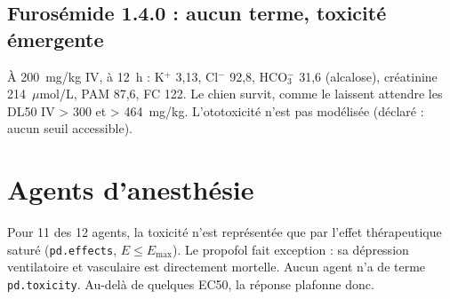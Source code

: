 \documentclass[10pt,a4paper]{article}
\newcommand{\cmd}[1]{\texttt{#1}}
\begin{document}
\subsection*{Furosémide 1.4.0 : aucun terme, toxicité émergente}

À \SI{200}{mg/kg} IV, à \SI{12}{h} : K$^+$ 3,13, Cl$^-$ 92,8, HCO$_3^-$ 31,6 (alcalose), créatinine 214~$\mu$mol/L, PAM 87,6, FC 122. Le chien survit, comme le laissent attendre les DL50 IV > 300 et > 464~mg/kg. L'ototoxicité n'est pas modélisée (déclaré : aucun seuil accessible).

\section{Agents d'anesthésie}

Pour 11 des 12 agents, la toxicité n'est représentée que par l'effet thérapeutique saturé (\cmd{pd.effects}, $E \leq E_\text{max}$). Le propofol fait exception : sa dépression ventilatoire et vasculaire est directement mortelle. Aucun agent n'a de terme \cmd{pd.toxicity}. Au-delà de quelques EC50, la réponse plafonne donc.
\end{document}
